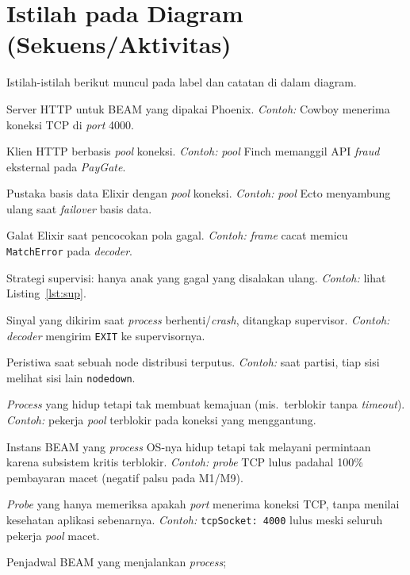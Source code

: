 \section{Istilah pada Diagram (Sekuens/Aktivitas)}
Istilah-istilah berikut muncul pada label dan catatan di dalam diagram.
\begin{description}[style=nextline,leftmargin=1.4em]
  \item[Cowboy / Bandit] Server HTTP untuk BEAM yang dipakai Phoenix. \emph{Contoh:}
    Cowboy menerima koneksi TCP di \emph{port} 4000.
  \item[Finch] Klien HTTP berbasis \emph{pool} koneksi. \emph{Contoh:} \emph{pool} Finch
    memanggil API \emph{fraud} eksternal pada \emph{PayGate}.
  \item[Ecto] Pustaka basis data Elixir dengan \emph{pool} koneksi. \emph{Contoh:}
    \emph{pool} Ecto menyambung ulang saat \emph{failover} basis data.
  \item[MatchError] Galat Elixir saat pencocokan pola gagal. \emph{Contoh:} \emph{frame}
    cacat memicu \texttt{MatchError} pada \emph{decoder}.
  \item[\texttt{:one\_for\_one}] Strategi supervisi: hanya anak yang gagal yang disalakan
    ulang. \emph{Contoh:} lihat Listing~\ref{lst:sup}.
  \item[EXIT] Sinyal yang dikirim saat \emph{process} berhenti/\emph{crash}, ditangkap
    supervisor. \emph{Contoh:} \emph{decoder} mengirim \texttt{EXIT} ke supervisornya.
  \item[nodedown] Peristiwa saat sebuah node distribusi terputus. \emph{Contoh:} saat
    partisi, tiap sisi melihat sisi lain \texttt{nodedown}.
  \item[Wedged (macet)] \emph{Process} yang hidup tetapi tak membuat kemajuan (mis.\
    terblokir tanpa \emph{timeout}). \emph{Contoh:} pekerja \emph{pool} terblokir pada
    koneksi yang menggantung.
  \item[Wedged VM] Instans BEAM yang \emph{process} OS-nya hidup tetapi tak melayani
    permintaan karena subsistem kritis terblokir. \emph{Contoh:} \emph{probe} TCP lulus
    padahal 100\% pembayaran macet (negatif palsu pada M1/M9).
  \item[Naive TCP probe] \emph{Probe} yang hanya memeriksa apakah \emph{port} menerima
    koneksi TCP, tanpa menilai kesehatan aplikasi sebenarnya. \emph{Contoh:}
    \texttt{tcpSocket: 4000} lulus meski seluruh pekerja \emph{pool} macet.
  \item[Scheduler / utilisasi scheduler] Penjadwal BEAM yang menjalankan \emph{process};

\end{description}
